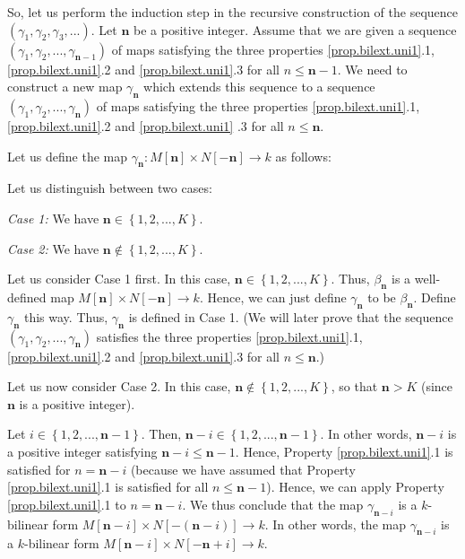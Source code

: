\documentclass[etingof-lie.tex]{subfiles}
\begin{document}
\begin{noncompile}
So, let us perform the induction step in the recursive construction of the
sequence $\left(  \gamma_{1},\gamma_{2},\gamma_{3},...\right)  $. Let
$\mathbf{n}$ be a positive integer. Assume that we are given a sequence
$\left(  \gamma_{1},\gamma_{2},...,\gamma_{\mathbf{n}-1}\right)  $ of maps
satisfying the three properties \ref{prop.bilext.uni1}.1,
\ref{prop.bilext.uni1}.2 and \ref{prop.bilext.uni1}.3 for all $n\leq
\mathbf{n}-1$. We need to construct a new map $\gamma_{\mathbf{n}}$ which
extends this sequence to a sequence $\left(  \gamma_{1},\gamma_{2}%
,...,\gamma_{\mathbf{n}}\right)  $ of maps satisfying the three properties
\ref{prop.bilext.uni1}.1, \ref{prop.bilext.uni1}.2 and \ref{prop.bilext.uni1}%
.3 for all $n\leq\mathbf{n}$.

Let us define the map $\gamma_{\mathbf{n}}:M\left[  \mathbf{n}\right]  \times
N\left[  -\mathbf{n}\right]  \rightarrow k$ as follows:

Let us distinguish between two cases:

\textit{Case 1:} We have $\mathbf{n}\in\left\{  1,2,...,K\right\}  $.

\textit{Case 2:} We have $\mathbf{n}\notin\left\{  1,2,...,K\right\}  $.

Let us consider Case 1 first. In this case, $\mathbf{n}\in\left\{
1,2,...,K\right\}  $. Thus, $\beta_{\mathbf{n}}$ is a well-defined map
$M\left[  \mathbf{n}\right]  \times N\left[  -\mathbf{n}\right]  \rightarrow
k$. Hence, we can just define $\gamma_{\mathbf{n}}$ to be $\beta_{\mathbf{n}}%
$. Define $\gamma_{\mathbf{n}}$ this way. Thus, $\gamma_{\mathbf{n}}$ is
defined in Case 1. (We will later prove that the sequence $\left(  \gamma
_{1},\gamma_{2},...,\gamma_{\mathbf{n}}\right)  $ satisfies the three
properties \ref{prop.bilext.uni1}.1, \ref{prop.bilext.uni1}.2 and
\ref{prop.bilext.uni1}.3 for all $n\leq\mathbf{n}$.)

Let us now consider Case 2. In this case, $\mathbf{n}\notin\left\{
1,2,...,K\right\}  $, so that $\mathbf{n}>K$ (since $\mathbf{n}$ is a positive integer).

Let $i\in\left\{  1,2,...,\mathbf{n}-1\right\}  $. Then, $\mathbf{n}%
-i\in\left\{  1,2,...,\mathbf{n}-1\right\}  $. In other words, $\mathbf{n}-i$
is a positive integer satisfying $\mathbf{n}-i\leq\mathbf{n}-1$. Hence,
Property \ref{prop.bilext.uni1}.1 is satisfied for $n=\mathbf{n}-i$ (because
we have assumed that Property \ref{prop.bilext.uni1}.1 is satisfied for all
$n\leq\mathbf{n}-1$). Hence, we can apply Property \ref{prop.bilext.uni1}.1 to
$n=\mathbf{n}-i$. We thus conclude that the map $\gamma_{\mathbf{n}-i}$ is a
$k$-bilinear form $M\left[  \mathbf{n}-i\right]  \times N\left[  -\left(
\mathbf{n}-i\right)  \right]  \rightarrow k$. In other words, the map
$\gamma_{\mathbf{n}-i}$ is a $k$-bilinear form $M\left[  \mathbf{n}-i\right]
\times N\left[  -\mathbf{n}+i\right]  \rightarrow k$.


\end{noncompile}
\end{document}
